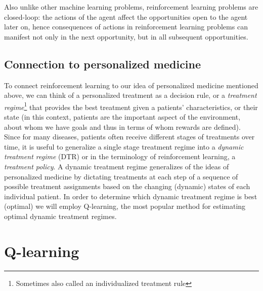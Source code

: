 \documentclass[12pt]{article}
\begin{document}
Also unlike other machine learning problems, reinforcement learning problems are closed-loop: the actions of the agent affect the opportunities open to the agent later on, hence consequences of actions in reinforcement learning problems can manifest not only in the next opportunity, but in all subsequent opportunities.


\subsection{Connection to personalized medicine} %
\label{sub:dynamic_treatment_regimes}

To connect reinforcement learning to our idea of personalized medicine mentioned above, we can think of a personalized treatment as a decision rule, or a \emph{treatment regime}\footnote{Sometimes also called an individualized treatment rule} that provides the best treatment given a patients' characteristics, or their state (in this context, patients are the important aspect of the environment, about whom we have goals and thus in terms of whom rewards are defined). Since for many diseases, patients often receive different stages of treatments over time, it is useful to generalize a single stage treatment regime into a \emph{dynamic treatment regime} (DTR) or in the terminology of reinforcement learning, a \emph{treatment policy}. A dynamic treatment regime generalizes of the ideas of personalized medicine by dictating treatments at each step of a sequence of possible treatment assignments based on the changing (dynamic) states of each individual patient. In order to determine which dynamic treatment regime is best (optimal) we will employ Q-learning, the most popular method for estimating optimal dynamic treatment regimes.



\section{Q-learning} %
\label{sec:q_learning}
\end{document}
